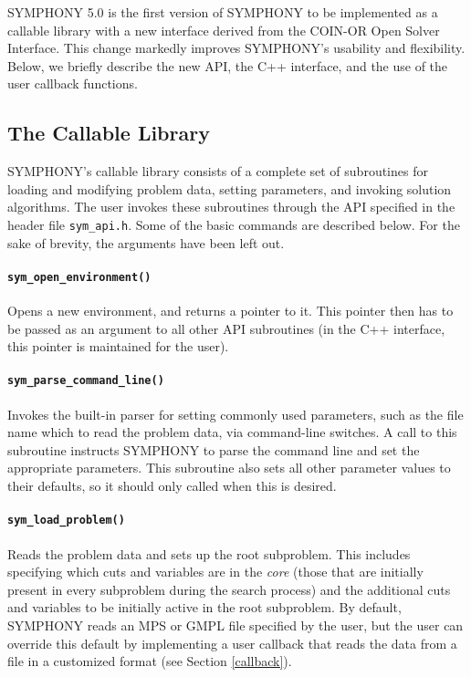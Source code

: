 SYMPHONY 5.0 is the first version of SYMPHONY to be implemented as a callable
library with a new interface derived from the COIN-OR Open Solver Interface.
This change markedly improves SYMPHONY's usability and flexibility. Below, we
briefly describe the new API, the C++ interface, and the use of the user
callback functions.

\subsection{The Callable Library}\label{callable_library}

SYMPHONY's callable library consists of a complete set of subroutines for
loading and modifying problem data, setting parameters, and invoking solution
algorithms. The user invokes these subroutines through the API specified in
the header file \texttt{sym\_api.h}. Some of the basic commands are described
below. For the sake of brevity, the arguments have been left out. 

\paragraph{\texttt{sym\_open\_environment()}} Opens a new environment, and
returns a pointer to it. This pointer then has to be passed as an argument to
all other API subroutines (in the C++ interface, this pointer is maintained
for the user).

\paragraph{\texttt{sym\_parse\_command\_line()}} Invokes the built-in
parser for setting commonly used parameters, such as the file name which to
read the problem data, via command-line switches. A call to this subroutine
instructs SYMPHONY to parse the command line and set the appropriate
parameters. This subroutine also sets all other parameter values to their
defaults, so it should only called when this is desired.

\paragraph{\texttt{sym\_load\_problem()}} Reads the problem data and sets up
the root subproblem. This includes specifying which cuts and variables are in
the \emph{core} (those that are initially present in every subproblem during
the search process) and the additional cuts and variables to be initially
active in the root subproblem. By default, SYMPHONY reads an MPS or GMPL
file specified by the user, but the user can override this default by
implementing a user callback that reads the data from a file in a customized
format (see Section \ref{callback}).

